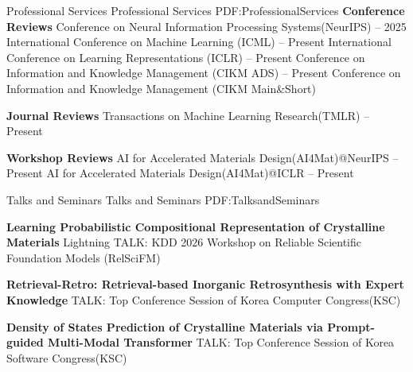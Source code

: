 \documentclass[letterpaper,MMMyyyy,nonstopmode]{simpleresumecv}
\begin{document}
\begin{Body}
\Section
{Professional Services}
{Professional Services}
{PDF:ProfessionalServices}
\textbf{Conference Reviews}
\BulletItem
Conference on Neural Information Processing Systems(NeurIPS)  
\hfill {} -- 2025
\BulletItem
International Conference on Machine Learning (ICML)  
\hfill {} -- Present
\BulletItem
International Conference on Learning Representations (ICLR)  
\hfill {} -- Present
\BulletItem
Conference on Information and Knowledge Management (CIKM ADS)  
\hfill {} -- Present
\BulletItem
Conference on Information and Knowledge Management (CIKM Main\&Short)  
\hfill {}

\textbf{Journal Reviews}
\BulletItem
Transactions on Machine Learning Research(TMLR)  
\hfill {} -- Present

\textbf{Workshop Reviews}
\BulletItem
AI for Accelerated Materials Design(AI4Mat)@NeurIPS
\hfill {} -- Present
\BulletItem
AI for Accelerated Materials Design(AI4Mat)@ICLR
\hfill {} -- Present



\Section
{Talks and Seminars}
{Talks and Seminars}
{PDF:TalksandSeminars}

\textbf{Learning Probabilistic Compositional Representation of Crystalline Materials}
\BulletItem
Lightning TALK: KDD 2026 Workshop on Reliable Scientific Foundation Models (RelSciFM)
\hfill {}



\textbf{Retrieval-Retro: Retrieval-based Inorganic Retrosynthesis with Expert Knowledge}
\BulletItem
TALK: Top Conference Session of Korea Computer Congress(KSC)  
\hfill {}



\textbf{Density of States Prediction of Crystalline Materials via Prompt-guided Multi-Modal Transformer}
\BulletItem
TALK: Top Conference Session of Korea Software Congress(KSC)  
\hfill {}





\end{Body}
\end{document}

